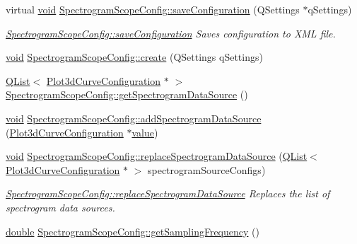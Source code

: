 \begin{DoxyCompactItemize}
\item 
virtual \hyperlink{group___u_a_v_objects_plugin_ga444cf2ff3f0ecbe028adce838d373f5c}{void} \hyperlink{group___scope_plugin_ga11e36d400c5929b6feb7c6e2fb0ba30f}{Spectrogram\-Scope\-Config\-::save\-Configuration} (Q\-Settings $\ast$q\-Settings)
\begin{DoxyCompactList}\small\item\em \hyperlink{group___scope_plugin_ga11e36d400c5929b6feb7c6e2fb0ba30f}{Spectrogram\-Scope\-Config\-::save\-Configuration} Saves configuration to X\-M\-L file. \end{DoxyCompactList}\item 
\hyperlink{group___u_a_v_objects_plugin_ga444cf2ff3f0ecbe028adce838d373f5c}{void} \hyperlink{group___scope_plugin_ga764cb2be26dd64d438f6ff61da3f1c92}{Spectrogram\-Scope\-Config\-::create} (Q\-Settings q\-Settings)
\item 
\hyperlink{class_q_list}{Q\-List}$<$ \hyperlink{struct_plot3d_curve_configuration}{Plot3d\-Curve\-Configuration} $\ast$ $>$ \hyperlink{group___scope_plugin_ga0f006cce4d464191ee21a19fad8c8ee1}{Spectrogram\-Scope\-Config\-::get\-Spectrogram\-Data\-Source} ()
\item 
\hyperlink{group___u_a_v_objects_plugin_ga444cf2ff3f0ecbe028adce838d373f5c}{void} \hyperlink{group___scope_plugin_ga7c459607813f5554b33051a7a8bc0e24}{Spectrogram\-Scope\-Config\-::add\-Spectrogram\-Data\-Source} (\hyperlink{struct_plot3d_curve_configuration}{Plot3d\-Curve\-Configuration} $\ast$\hyperlink{glext_8h_aa0e2e9cea7f208d28acda0480144beb0}{value})
\item 
\hyperlink{group___u_a_v_objects_plugin_ga444cf2ff3f0ecbe028adce838d373f5c}{void} \hyperlink{group___scope_plugin_ga3202b61b6cde085652ea649879e48c63}{Spectrogram\-Scope\-Config\-::replace\-Spectrogram\-Data\-Source} (\hyperlink{class_q_list}{Q\-List}$<$ \hyperlink{struct_plot3d_curve_configuration}{Plot3d\-Curve\-Configuration} $\ast$ $>$ spectrogram\-Source\-Configs)
\begin{DoxyCompactList}\small\item\em \hyperlink{group___scope_plugin_ga3202b61b6cde085652ea649879e48c63}{Spectrogram\-Scope\-Config\-::replace\-Spectrogram\-Data\-Source} Replaces the list of spectrogram data sources. \end{DoxyCompactList}\item 
\hyperlink{_super_l_u_support_8h_a8956b2b9f49bf918deed98379d159ca7}{double} \hyperlink{group___scope_plugin_ga4fb9d3be277337c045b46845bab20f39}{Spectrogram\-Scope\-Config\-::get\-Sampling\-Frequency} ()

\end{DoxyCompactItemize}
